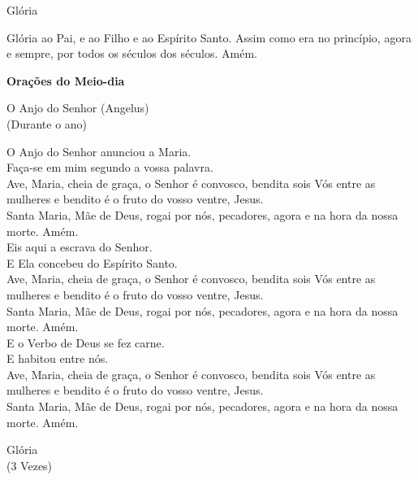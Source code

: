 \documentclass{book}
\begin{document}
\begin{center}
    Glória
\end{center}
\begin{flushleft}
    Glória ao Pai, e ao Filho e ao Espírito Santo. Assim como era no princípio, agora e sempre, por todos os séculos dos séculos. Amém.
\end{flushleft}
\newpage
\begin{center}
    \textbf{Orações do Meio-dia}
\end{center}
\begin{center}
    O Anjo do Senhor (Angelus) \\ \textcolor{VioletRed2}{\scriptsize{(Durante o ano)}}
\end{center}
\begin{flushleft}
    \VbarRed{} O Anjo do Senhor anunciou a Maria. \\
    \RbarRed{} Faça-se em mim segundo a vossa palavra. \\
    \VbarRed{} Ave, Maria, cheia de graça, o Senhor é convosco, bendita sois Vós entre as mulheres e bendito é o fruto do vosso ventre, Jesus. \\
    \RbarRed{} Santa Maria, Mãe de Deus, rogai por nós, pecadores, agora e na hora da nossa morte. Amém.
    \vspace{.2cm} \\
    \VbarRed{} Eis aqui a escrava do Senhor. \\
    \RbarRed{} E Ela concebeu do Espírito Santo. \\
    \VbarRed{} Ave, Maria, cheia de graça, o Senhor é convosco, bendita sois Vós entre as mulheres e bendito é o fruto do vosso ventre, Jesus. \\
    \RbarRed{} Santa Maria, Mãe de Deus, rogai por nós, pecadores, agora e na hora da nossa morte. Amém.
    \vspace{.2cm} \\
    \VbarRed{} E o Verbo de Deus se fez carne. \\
    \RbarRed{} E habitou entre nós. \\
    \VbarRed{} Ave, Maria, cheia de graça, o Senhor é convosco, bendita sois Vós entre as mulheres e bendito é o fruto do vosso ventre, Jesus. \\
    \RbarRed{} Santa Maria, Mãe de Deus, rogai por nós, pecadores, agora e na hora da nossa morte. Amém.
\end{flushleft}
\begin{center}
    Glória \\ \textcolor{VioletRed2}{\scriptsize{(3 Vezes)}}
\end{center}
\end{document}
